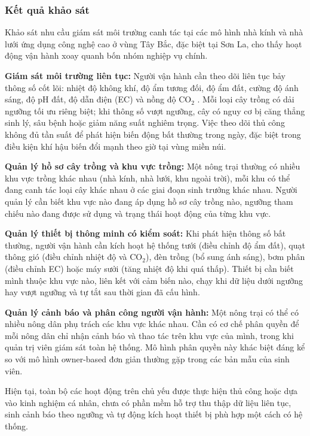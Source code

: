 \documentclass[13pt,a4paper]{extarticle}
\numberwithin{figure}{section}
\numberwithin{table}{section}
\begin{document}
	\subsubsection{Kết quả khảo sát}
	
	Khảo sát nhu cầu giám sát môi trường canh tác tại các mô hình nhà kính và nhà lưới ứng dụng công nghệ cao ở vùng Tây Bắc, đặc biệt tại Sơn La, cho thấy hoạt động vận hành xoay quanh bốn nhóm nghiệp vụ chính.
	
	\textbf{Giám sát môi trường liên tục:} Người vận hành cần theo dõi liên tục bảy thông số cốt lõi: nhiệt độ không khí, độ ẩm tương đối, độ ẩm đất, cường độ ánh sáng, độ pH đất, độ dẫn điện (EC) và nồng độ CO$_2$ \cite{soussi2024}. Mỗi loại cây trồng có dải ngưỡng tối ưu riêng biệt; khi thông số vượt ngưỡng, cây có nguy cơ bị căng thẳng sinh lý, sâu bệnh hoặc giảm năng suất nghiêm trọng. Việc theo dõi thủ công không đủ tần suất để phát hiện biến động bất thường trong ngày, đặc biệt trong điều kiện khí hậu biến đổi mạnh theo giờ tại vùng miền núi.
	
	\textbf{Quản lý hồ sơ cây trồng và khu vực trồng:} Một nông trại thường có nhiều khu vực trồng khác nhau (nhà kính, nhà lưới, khu ngoài trời), mỗi khu có thể đang canh tác loại cây khác nhau ở các giai đoạn sinh trưởng khác nhau. Người quản lý cần biết khu vực nào đang áp dụng hồ sơ cây trồng nào, ngưỡng tham chiếu nào đang được sử dụng và trạng thái hoạt động của từng khu vực.
	
	\textbf{Quản lý thiết bị thông minh có kiểm soát:} Khi phát hiện thông số bất thường, người vận hành cần kích hoạt hệ thống tưới (điều chỉnh độ ẩm đất), quạt thông gió (điều chỉnh nhiệt độ và CO$_2$), đèn trồng (bổ sung ánh sáng), bơm phân (điều chỉnh EC) hoặc máy sưởi (tăng nhiệt độ khi quá thấp). Thiết bị cần biết mình thuộc khu vực nào, liên kết với cảm biến nào, chạy khi dữ liệu dưới ngưỡng hay vượt ngưỡng và tự tắt sau thời gian đã cấu hình.
	
	\textbf{Quản lý cảnh báo và phân công người vận hành:} Một nông trại có thể có nhiều nông dân phụ trách các khu vực khác nhau. Cần có cơ chế phân quyền để mỗi nông dân chỉ nhận cảnh báo và thao tác trên khu vực của mình, trong khi quản trị viên giám sát toàn hệ thống. Mô hình phân quyền này khác biệt đáng kể so với mô hình owner-based đơn giản thường gặp trong các bản mẫu của sinh viên.
	
	Hiện tại, toàn bộ các hoạt động trên chủ yếu được thực hiện thủ công hoặc dựa vào kinh nghiệm cá nhân, chưa có phần mềm hỗ trợ thu thập dữ liệu liên tục, sinh cảnh báo theo ngưỡng và tự động kích hoạt thiết bị phù hợp một cách có hệ thống.
	
\end{document}
